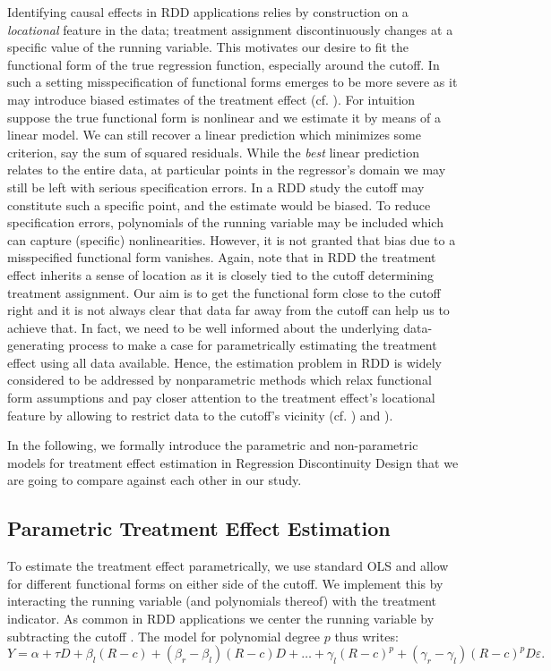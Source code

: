 \documentclass[11pt, a4paper, leqno]{article}
\numberwithin{equation}{section}
\numberwithin{figure}{section}
\numberwithin{table}{section}
\numberwithin{algorithm}{section}
\begin{document}
Identifying causal effects in RDD applications relies by construction on a \textit{locational} feature in the data; treatment assignment discontinuously changes at a specific value of the running variable. This motivates our desire to fit the functional form of the true regression function, especially around the cutoff. In such a setting misspecification of functional forms emerges to be more severe as it may introduce biased estimates of the treatment effect (cf. \cite{lee_lemieux}). For intuition suppose the true functional form is nonlinear and we estimate it by means of a linear model. We can still recover a linear prediction which minimizes some criterion, say the sum of squared residuals. While the \textit{best} linear prediction relates to the entire data, at particular points in the regressor's domain we may still be left with serious specification errors. In a RDD study the cutoff may constitute such a specific point, and the estimate would be biased. To reduce specification errors, polynomials of the running variable may be included which can capture (specific) nonlinearities. However, it is not granted that bias due to a misspecified functional form vanishes. Again, note that in RDD the treatment effect inherits a sense of location as it is closely tied to the cutoff determining treatment assignment. Our aim is to get the functional form close to the cutoff right and it is not always clear that data far away from the cutoff can help us to achieve that. In fact, we need to be well informed about the underlying data-generating process to make a case for parametrically estimating the treatment effect using all data available. Hence, the estimation problem in RDD is widely considered to be addressed by nonparametric methods which relax functional form assumptions and pay closer attention to the treatment effect's locational feature by allowing to restrict data to the cutoff's vicinity (cf. \cite{hahn_et_al}) and \cite{lee_lemieux}).

In the following, we formally introduce the parametric and non-parametric models for treatment effect estimation in Regression Discontinuity Design that we are going to compare against each other in our study.


\subsection{Parametric Treatment Effect Estimation} %
\label{sec: param}
To estimate the treatment effect parametrically, we use standard OLS and allow for different functional forms on either side of the cutoff. We implement this by interacting the running variable (and polynomials thereof) with the treatment indicator. As common in RDD applications we center the running variable by subtracting the cutoff \cite{lee_lemieux}. The model for polynomial degree $p$ thus writes:
\begin{equation}
Y = \alpha + \tau D + \beta_{l} (R-c) + (\beta_{r} - \beta_{l}) (R-c) D + \dots + \gamma_{l} (R-c)^p + (\gamma_{r} - \gamma_{l}) (R-c)^p D \varepsilon .
\label{eq: model_param}
\end{equation}
\end{document}
